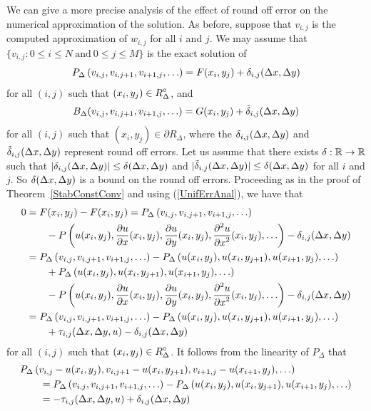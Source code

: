 We can give a more precise analysis of the effect of round off error on
the numerical approximation of the solution.  As before, suppose that
$v_{i,j}$ is the computed approximation of $w_{i,j}$ for all $i$ and
$j$.  We may assume that
$\{ v_{i,j} : 0 \leq i \leq N \ \text{and} \ 0 \leq j \leq M \}$ is
the exact solution of
\begin{equation} \label{UnifErrAnal}
P_\Delta\left(v_{i,j}, v_{i,j+1}, v_{i+1,j}, \ldots\right)
= F(x_i,y_j) + \delta_{i,j}(\Delta{x},\Delta{y})
\end{equation}
for all $(i,j)$ such that $\displaystyle (x_i,y_j) \in R^\circ_\Delta$, and
\[
B_\Delta(v_{i,j},v_{i,j+1},v_{i+1,j}, \ldots)
= G(x_i,y_j) + \tilde{\delta}_{i,j}(\Delta{x},\Delta{y})
\]
for all $(i,j)$ such that $(x_i,y_j) \in \partial R_\Delta$, where
the $\delta_{i,j}(\Delta{x},\Delta{y})$ and
$\tilde{\delta}_{i,j}(\Delta{x},\Delta{y})$ represent round off errors.
Let us assume that there exists $\delta:\mathbb{R}\to\mathbb{R}$ such that 
$|\delta_{i,j}(\Delta{x},\Delta{y})| \leq \delta(\Delta{x},\Delta{y})$
and
$|\tilde{\delta}_{i,j}(\Delta{x},\Delta{y})| \leq \delta(\Delta{x},\Delta{y})$
for all $i$ and $j$.  So $\delta(\Delta{x},\Delta{y})$ is a bound on the
round off errors.  Proceeding as in the proof of
Theorem~\ref{StabConstConv} and using (\ref{UnifErrAnal}), we have that
\begin{align*}
0 &= F(x_i,y_j) - F(x_i,y_j)
= P_\Delta\left(v_{i,j}, v_{i,j+1}, v_{i+1,j}, \ldots\right) \\
&\qquad - P\left(u(x_i,y_j), \frac{\partial{u}}{\partial{x}}(x_i,y_j), \frac{\partial{u}}{\partial{y}}(x_i,y_j),
\frac{\displaystyle \partial^{2}{u}} {\displaystyle \partial{x}^{2}}(x_i,y_j), \ldots \right) - \delta_{i,j}(\Delta{x},\Delta{y}) \\
&= P_\Delta\left(v_{i,j}, v_{i,j+1}, v_{i+1,j}, \ldots\right) - 
  P_\Delta\left(u(x_i,y_j), u(x_i,y_{j+1}), u(x_{i+1},y_j),\ldots \right) \\
&\qquad + P_\Delta\left(u(x_i,y_j), u(x_i,y_{j+1}),
  u(x_{i+1},y_j), \ldots \right) \\
&\qquad - P\left(u(x_i,y_j), \frac{\partial{u}}{\partial{x}}(x_i,y_j), \frac{\partial{u}}{\partial{y}}(x_i,y_j),
\frac{\displaystyle \partial^{2}{u}} {\displaystyle \partial{x}^{2}}(x_i,y_j), \ldots \right) - \delta_{i,j}(\Delta{x},\Delta{y}) \\
&= P_\Delta\left(v_{i,j}, v_{i,j+1}, v_{i+1,j}, \ldots\right) - 
  P_\Delta\left(u(x_i,y_j), u(x_i,y_{j+1}), u(x_{i+1},y_j),\ldots \right) \\
&\qquad + \tau_{i,j}(\Delta{x},\Delta{y},u) - \delta_{i,j}(\Delta{x},\Delta{y})
\end{align*}
for all $(i,j)$ such that $\displaystyle (x_i,y_j) \in R^\circ_\Delta$.
It follows from the linearity of $P_\Delta$ that
\begin{align*}
&P_\Delta\left(v_{i,j}-u(x_i,y_j), v_{i,j+1}-u(x_i,y_{j+1}),
v_{i+1,j}-u(x_{i+1},y_j), \ldots\right) \\
&\qquad = P_\Delta\left(v_{i,j}, v_{i,j+1}, v_{i+1,j}, \ldots\right) - 
P_\Delta\left(u(x_i,y_j), u(x_i,y_{j+1}), u(x_{i+1},y_j), \ldots \right) \\
&\qquad = -\tau_{i,j}(\Delta{x},\Delta{y},u) + \delta_{i,j}(\Delta{x},\Delta{y})
\end{align*}
